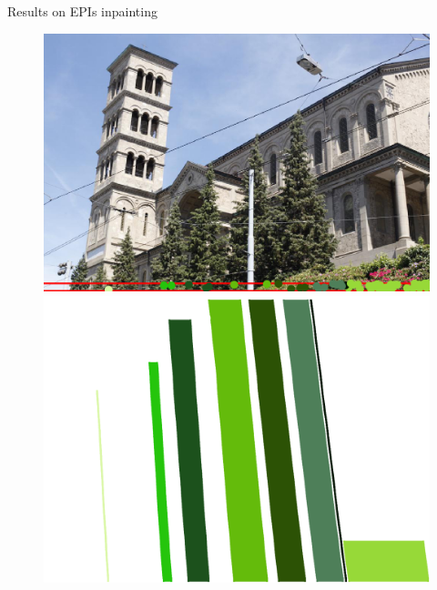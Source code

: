 \begin{frame}{Results on EPIs inpainting}
\begin{figure}[!tbp]
  \centering
  \begin{minipage}[b]{0.40\textwidth}
    \includegraphics[width=\textwidth]{../../Diagrams/results/EPIs/673_10_102_4_48_8_strip.png}
  \end{minipage}
	\pause
  \begin{minipage}[b]{0.40\textwidth}
    \includegraphics[width=\textwidth]{../../Diagrams/results/EPIs/673_10_102_7_48_8_dense.png}
  \end{minipage}
\end{figure}
\pause


\end{frame}
